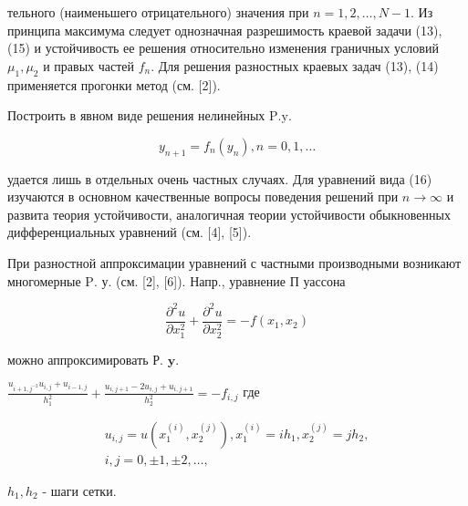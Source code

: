 \documentclass[10pt]{article}
\begin{document}
тельного (наименьшего отрицательного) значения при $n=1,2, \ldots, N-1$. Из принципа максимума следует однозначная разрешимость краевой задачи (13), (15) и устойчивость ее решения относительно изменения граничных условий $\mu_{1}, \mu_{2}$ и правых частей $f_{n}$. Для решения разностных краевых задач (13), (14) применяется прогонки метод (см. [2]).



Построить в явном виде решения нелинейных $\mathrm{P} . \mathrm{y}$.



\[

y_{n+1}=f_{n}\left(y_{n}\right), n=0,1, \ldots

\]



удается лишь в отдельных очень частных случаях. Для уравнений вида (16) изучаются в основном качественные вопросы поведения решений при $n \rightarrow \infty$ и развита теория устойчивости, аналогичная теории устойчивости обыкновенных дифференциальных уравнений (см. [4], [5]).



При разностной аппроксимации уравнений с частными производными возникают многомерные $\mathrm{P}$. у. (см. [2], [6]). Напр., уравнение П уассона



\[

\frac{\partial^{2} u}{\partial x_{1}^{2}}+\frac{\partial^{2} u}{\partial x_{2}^{2}}=-f\left(x_{1}, x_{2}\right)

\]



можно аппроксимировать Р. $\mathbf{y}$.



$\frac{u_{i+1, j^{-2}} u_{i, j}+u_{i-1, j}}{h_{1}^{2}}+\frac{u_{i, j+1}-2 u_{i, j}+u_{i, j+1}}{h_{2}^{2}}=-f_{i, j}$ где



\[

\begin{gathered}

u_{i, j}=u\left(x_{1}^{(i)}, x_{2}^{(j)}\right), x_{1}^{(i)}=i h_{1}, x_{2}^{(j)}=j h_{2}, \\

i, j=0, \pm 1, \pm 2, \ldots,

\end{gathered}

\]



$h_{1}, h_{2}$ - шаги сетки.
\end{document}
